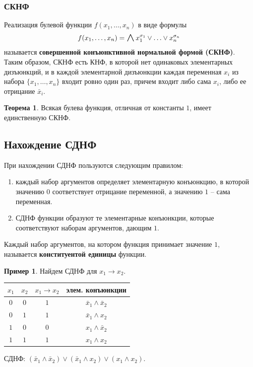 \documentclass[a5paper, 11pt]{extarticle}
\theoremstyle{definition}
\newtheorem*{theorem*}{Теорема}
\newtheorem*{example*}{Пример}
\theoremstyle{definition}
\theoremstyle{definition}
\numberwithin{figure}{section}
\numberwithin{table}{section}
\DeclareMathOperator{\bigland}{\mathrel{\raisebox{-.4ex}{$\mathlarger{\mathlarger{\mathlarger{\mathlarger{\land}}}}$}}}
\begin{document}
\subsubsection{СКНФ}

Реализация булевой функции \(f(x_1, \ldots, x_n)\) в виде формулы
\[
    f(x_1, \ldots, x_n) = \bigland x_1^{\sigma_1} \lor \ldots \lor x_n^{\sigma_n}
\]
называется \textbf{совершенной конъюнктивной нормальной формой (СКНФ)}. Таким образом, СКНФ есть КНФ, в которой нет одинаковых элементарных дизъюнкций, и в каждой элементарной дизъюнкции каждая переменная \(x_i\) из набора \(\{x_1, \ldots, x_n\}\) входит ровно один раз, причем входит либо сама \(x_i\), либо ее отрицание \(\bar{x}_i\).

\begin{theorem*}
    Всякая булева функция, отличная от константы \(1\), имеет единственную СКНФ.
\end{theorem*}

\subsection{Нахождение СДНФ}

\noindent При нахождении СДНФ пользуются следующим правилом:
\begin{enumerate}
    \item каждый набор аргументов определяет элементарную конъюнкцию, в которой значению \(0\) соответствует отрицание переменной, а значению \(1\) -- сама переменная.
    \item СДНФ функции образуют те элементарные конъюнкции, которые соответствуют наборам аргументов, дающим \(1\).
\end{enumerate}

Каждый набор аргументов, на котором функция принимает значение \(1\), называется \textbf{конституентой единицы} функции.

\begin{example*}
    Найдем СДНФ для \(x_1 \to x_2\).

        {
            \renewcommand{\arraystretch}{1.5}
            \begin{longtable}{|c|c|c|c|}
                \hline
                \(x_1\) & \(x_2\) & \(x_1 \to x_2\) & элем. конъюнкции              \\
                \hline
                \(0\)   & \(0\)   & \(1\)           & \(\bar{x}_1 \land \bar{x}_2\) \\
                \hline
                \(0\)   & \(1\)   & \(1\)           & \(\bar{x}_1 \land x_2\)       \\
                \hline
                \(1\)   & \(0\)   & \(0\)           & \(x_1 \land \bar{x}_2\)       \\
                \hline
                \(1\)   & \(1\)   & \(1\)           & \(x_1 \land x_2\)             \\
                \hline
            \end{longtable}
        }

    СДНФ: \((\bar{x}_1 \land \bar{x}_2) \lor (\bar{x}_1 \land x_2) \lor (x_1 \land x_2)\).
\end{example*}
\end{document}
